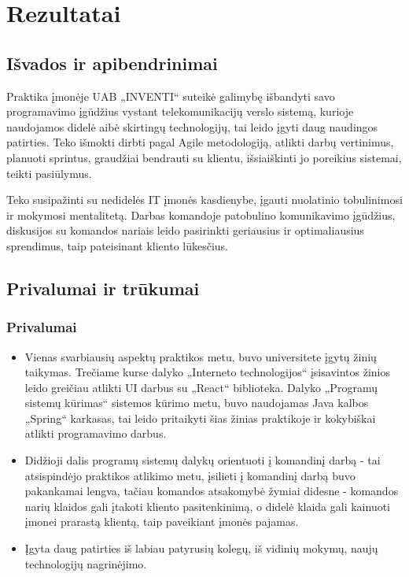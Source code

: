 \section{Rezultatai}

\subsection{Išvados ir apibendrinimai}

Praktika įmonėje UAB „INVENTI“ suteikė galimybę išbandyti savo programavimo įgūdžius vystant telekomunikacijų verslo sistemą,
kurioje naudojamos didelė aibė skirtingų technologijų, tai leido įgyti daug naudingos patirties. Teko išmokti dirbti pagal Agile metodologiją,
atlikti darbų vertinimus, planuoti sprintus, graudžiai bendrauti su klientu, išsiaiškinti jo poreikius sistemai, teikti pasiūlymus.

Teko susipažinti su nedidelės IT įmonės kasdienybe, įgauti nuolatinio tobulinimosi ir mokymosi mentalitetą. Darbas komandoje patobulino komunikavimo įgūdžius,
diskusijos su komandos nariais leido pasirinkti geriausius ir optimaliausius sprendimus, taip pateisinant kliento lūkesčius.

\subsection{Privalumai ir trūkumai}

\subsubsection{Privalumai}

\begin{itemize}
    \item Vienas svarbiausių aspektų praktikos metu, buvo universitete įgytų žinių taikymas. Trečiame kurse dalyko „Interneto technologijos“ įsisavintos žinios leido greičiau
    atlikti UI darbus su „React“ biblioteka. Dalyko „Programų sistemų kūrimas“ sistemos kūrimo metu, buvo naudojamas Java kalbos „Spring“ karkasas, tai
    leido pritaikyti šias žinias praktikoje ir kokybiškai atlikti programavimo darbus.
    \item Didžioji dalis programų sistemų dalykų orientuoti į komandinį darbą - tai atsispindėjo praktikos atlikimo metu, įsilieti į komandinį darbą buvo pakankamai lengva,
    tačiau komandos atsakomybė žymiai didesne - komandos narių klaidos gali įtakoti kliento pasitenkinimą, o didelė klaida gali kainuoti įmonei prarastą klientą, taip paveikiant
    įmonės pajamas.
    \item Įgyta daug patirties iš labiau patyrusių kolegų, iš vidinių mokymų, naujų technologijų nagrinėjimo.
\end{itemize}

